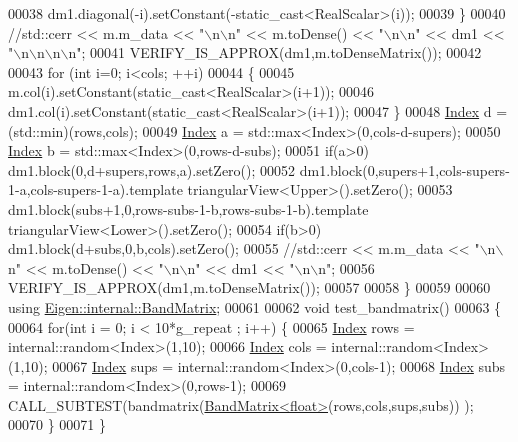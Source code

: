 \begin{DoxyCode}
00038     dm1.diagonal(-i).setConstant(-static\_cast<RealScalar>(i));
00039   \}
00040   \textcolor{comment}{//std::cerr << m.m\_data << "\(\backslash\)n\(\backslash\)n" << m.toDense() << "\(\backslash\)n\(\backslash\)n" << dm1 << "\(\backslash\)n\(\backslash\)n\(\backslash\)n\(\backslash\)n";}
00041   VERIFY\_IS\_APPROX(dm1,m.toDenseMatrix());
00042 
00043   \textcolor{keywordflow}{for} (\textcolor{keywordtype}{int} i=0; i<cols; ++i)
00044   \{
00045     m.col(i).setConstant(static\_cast<RealScalar>(i+1));
00046     dm1.col(i).setConstant(static\_cast<RealScalar>(i+1));
00047   \}
00048   \hyperlink{namespace_eigen_a62e77e0933482dafde8fe197d9a2cfde}{Index} d = (std::min)(rows,cols);
00049   \hyperlink{namespace_eigen_a62e77e0933482dafde8fe197d9a2cfde}{Index} a = std::max<Index>(0,cols-d-supers);
00050   \hyperlink{namespace_eigen_a62e77e0933482dafde8fe197d9a2cfde}{Index} b = std::max<Index>(0,rows-d-subs);
00051   \textcolor{keywordflow}{if}(a>0) dm1.block(0,d+supers,rows,a).setZero();
00052   dm1.block(0,supers+1,cols-supers-1-a,cols-supers-1-a).template triangularView<Upper>().setZero();
00053   dm1.block(subs+1,0,rows-subs-1-b,rows-subs-1-b).template triangularView<Lower>().setZero();
00054   \textcolor{keywordflow}{if}(b>0) dm1.block(d+subs,0,b,cols).setZero();
00055   \textcolor{comment}{//std::cerr << m.m\_data << "\(\backslash\)n\(\backslash\)n" << m.toDense() << "\(\backslash\)n\(\backslash\)n" << dm1 << "\(\backslash\)n\(\backslash\)n";}
00056   VERIFY\_IS\_APPROX(dm1,m.toDenseMatrix());
00057 
00058 \}
00059 
00060 \textcolor{keyword}{using} \hyperlink{group___core___module_class_eigen_1_1internal_1_1_band_matrix}{Eigen::internal::BandMatrix};
00061 
00062 \textcolor{keywordtype}{void} test\_bandmatrix()
00063 \{
00064   \textcolor{keywordflow}{for}(\textcolor{keywordtype}{int} i = 0; i < 10*g\_repeat ; i++) \{
00065     \hyperlink{namespace_eigen_a62e77e0933482dafde8fe197d9a2cfde}{Index} rows = internal::random<Index>(1,10);
00066     \hyperlink{namespace_eigen_a62e77e0933482dafde8fe197d9a2cfde}{Index} cols = internal::random<Index>(1,10);
00067     \hyperlink{namespace_eigen_a62e77e0933482dafde8fe197d9a2cfde}{Index} sups = internal::random<Index>(0,cols-1);
00068     \hyperlink{namespace_eigen_a62e77e0933482dafde8fe197d9a2cfde}{Index} subs = internal::random<Index>(0,rows-1);
00069     CALL\_SUBTEST(bandmatrix(\hyperlink{group___core___module_class_eigen_1_1internal_1_1_band_matrix}{BandMatrix<float>}(rows,cols,sups,subs)) );
00070   \}
00071 \}
\end{DoxyCode}
